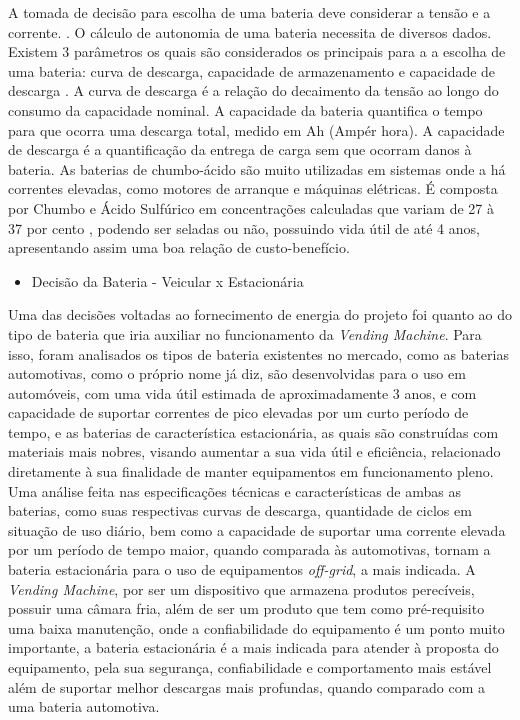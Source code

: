       A tomada de decisão para escolha de uma bateria deve considerar a tensão e a corrente.  \cite{de2011}. O cálculo de autonomia de uma bateria necessita de diversos dados. Existem 3 parâmetros os quais são considerados os principais para a a escolha de uma bateria: curva de descarga, capacidade de armazenamento e capacidade de descarga \cite{meggiolaro2006tutorial}. A curva de descarga é a relação do decaimento da tensão ao longo do consumo da capacidade nominal. A capacidade da bateria quantifica o tempo para que ocorra uma descarga total, medido em Ah (Ampér hora). A capacidade de descarga é a quantificação da entrega de carga sem que ocorram danos à bateria.
      As baterias de chumbo-ácido são muito utilizadas em sistemas onde a há correntes  elevadas, como motores de arranque e máquinas elétricas. É composta por Chumbo e Ácido Sulfúrico em concentrações calculadas que variam de 27 à 37 por cento \cite{de2005estudo}, podendo ser seladas ou não, possuindo vida útil de até 4 anos, apresentando assim uma boa relação de custo-benefício.

\begin{itemize}
\item Decisão da Bateria - Veicular x Estacionária
\end{itemize}

		Uma das decisões voltadas ao fornecimento de energia do projeto foi quanto ao do tipo de bateria que iria auxiliar no funcionamento da \textit{Vending Machine}. Para isso, foram analisados os tipos de bateria existentes no mercado, como as baterias automotivas, como o próprio nome já diz, são desenvolvidas para o uso em automóveis, com uma vida útil estimada de aproximadamente 3 anos, e com capacidade de suportar correntes de pico elevadas por um curto período de tempo, e as baterias de característica estacionária, as quais são construídas com materiais mais nobres, visando aumentar a sua vida útil e eficiência, relacionado diretamente à sua finalidade de manter equipamentos em funcionamento pleno.
    	Uma análise feita nas especificações técnicas e características de ambas as baterias, como suas respectivas curvas de descarga, quantidade de ciclos em situação de uso diário, bem como a capacidade de suportar uma corrente elevada por um período de tempo maior, quando comparada às automotivas, tornam a bateria estacionária para o uso de equipamentos\textit{ off-grid}, a mais indicada.
   		A \textit{Vending Machine}, por ser um dispositivo que armazena produtos perecíveis, possuir uma câmara fria, além de ser um produto que tem como pré-requisito uma baixa manutenção, onde a confiabilidade do equipamento é um ponto muito importante, a bateria estacionária é a mais indicada para atender à proposta do equipamento, pela sua segurança, confiabilidade e comportamento mais estável além de suportar melhor descargas mais profundas, quando comparado com a uma bateria automotiva.

